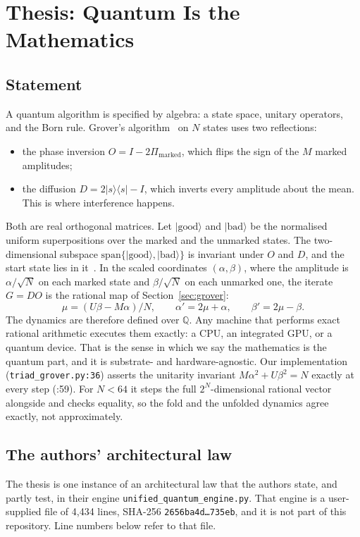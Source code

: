 \documentclass[11pt]{article}
\theoremstyle{definition}
\newcommand{\Q}{\mathbb{Q}}
\newcommand{\code}[1]{\texttt{\small #1}}
\begin{document}
\section{Thesis: Quantum Is the Mathematics}\label{sec:thesis}
\subsection{Statement}
A quantum algorithm is specified by algebra: a state space, unitary operators, and the Born rule. Grover's
algorithm~\cite{grover} on $N$ states uses two reflections:
\begin{itemize}
\item the phase inversion $O=I-2\Pi_{\mathrm{marked}}$, which flips the sign of the $M$ marked amplitudes;
\item the diffusion $D=2|s\rangle\langle s|-I$, which inverts every amplitude about the mean. This is where
interference happens.
\end{itemize}
Both are real orthogonal matrices. Let $|\mathrm{good}\rangle$ and $|\mathrm{bad}\rangle$ be the normalised uniform
superpositions over the marked and the unmarked states. The two-dimensional subspace
$\mathrm{span}\{|\mathrm{good}\rangle,|\mathrm{bad}\rangle\}$ is invariant under $O$ and $D$, and the start state
lies in it~\cite{bbht,nc}. In the scaled coordinates $(\alpha,\beta)$, where the amplitude is $\alpha/\sqrt N$ on
each marked state and $\beta/\sqrt N$ on each unmarked one, the iterate $G=DO$ is the rational map of
Section~\ref{sec:grover}:
\[ \mu=(U\beta-M\alpha)/N,\qquad \alpha'=2\mu+\alpha,\qquad \beta'=2\mu-\beta. \]
The dynamics are therefore defined over $\Q$. Any machine that performs exact rational arithmetic executes them
exactly: a CPU, an integrated GPU, or a quantum device. That is the sense in which we say the mathematics is the
quantum part, and it is substrate- and hardware-agnostic. Our implementation (\code{triad\_grover.py:36}) asserts the
unitarity invariant $M\alpha^2+U\beta^2=N$ exactly at every step (:59). For $N<64$ it steps the full
$2^N$-dimensional rational vector alongside and checks equality, so the fold and the unfolded dynamics agree exactly,
not approximately.

\subsection{The authors' architectural law}\label{sec:law}
The thesis is one instance of an architectural law that the authors state, and partly test, in their engine
\code{unified\_quantum\_engine.py}. That engine is a user-supplied file of 4,434 lines, SHA-256
\code{2656ba4d\ldots735eb}, and it is not part of this repository. Line numbers below refer to that file.
\end{document}
